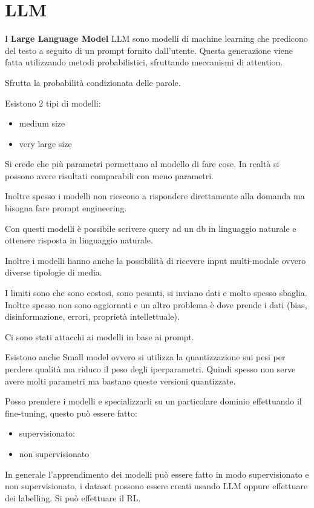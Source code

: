 \chapter{LLM}
I \textbf{Large Language Model} LLM sono modelli di machine learning che predicono
del testo a seguito di un prompt fornito dall'utente. Questa generazione viene
fatta utilizzando metodi probabilistici, sfruttando meccanismi di attention.

Sfrutta la probabilità condizionata delle parole.

Esistono 2 tipi di modelli:
\begin{itemize}
    \item medium size
    \item very large size
\end{itemize}

Si crede che più parametri permettano al modello di fare cose. In realtà si possono
avere risultati comparabili con meno parametri.

Inoltre spesso i modelli non riescono a rispondere direttamente alla domanda ma
bisogna fare prompt engineering.

Con questi modelli è possibile scrivere query ad un db in linguaggio naturale e
ottenere risposta in linguaggio naturale.

Inoltre i modelli hanno anche la possibilità di ricevere input multi-modale ovvero
diverse tipologie di media.

I limiti sono che sono costosi, sono pesanti, si inviano dati e molto spesso
sbaglia. Inoltre spesso non sono aggiornati e un altro problema è dove prende i
dati (bias, disinformazione, errori, proprietà intellettuale).

Ci sono stati attacchi ai modelli in base ai prompt.

Esistono anche Small model ovvero si utilizza la quantizzazione sui pesi per
perdere qualità ma riduco il peso degli iperparametri. Quindi spesso non serve
avere molti parametri ma bastano queste versioni quantizzate.

Posso prendere i modelli e specializzarli su un particolare dominio effettuando il
fine-tuning, questo può essere fatto:
\begin{itemize}
    \item supervisionato:
    \item non supervisionato
\end{itemize}

In generale l'apprendimento dei modelli può essere fatto in modo supervisionato
e non supervisionato, i dataset possono essere creati usando LLM oppure effettuare
dei labelling.
Si può effettuare il RL.

